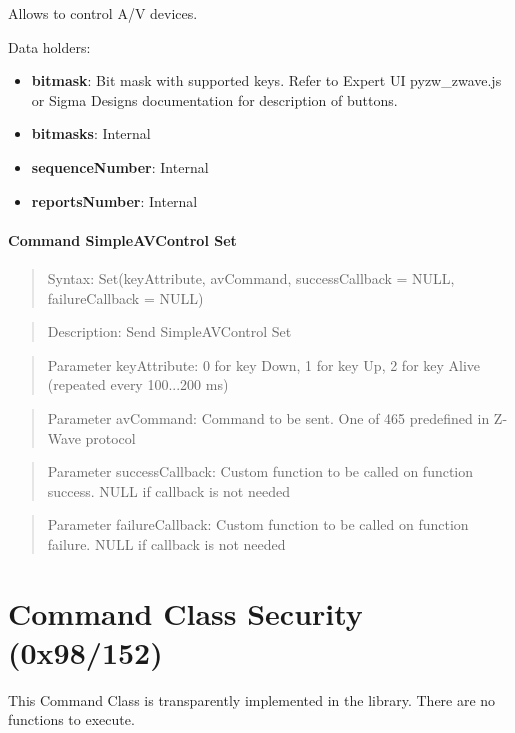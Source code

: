 Allows to control A/V devices.
\newline

\noindent
Data holders:

\begin{itemize}
\item \textbf{bitmask}: Bit mask with supported keys. Refer to Expert UI pyzw\_zwave.js or Sigma Designs documentation for description of buttons.
\item \textbf{bitmasks}: Internal
\item \textbf{sequenceNumber}: Internal
\item \textbf{reportsNumber}: Internal
\end{itemize}

\paragraph{Command SimpleAVControl Set}
\begin{quote}Syntax: Set(keyAttribute, avCommand, successCallback = NULL, failureCallback = NULL)\end{quote}
\begin{quote}Description: Send SimpleAVControl Set\end{quote}
\begin{quote}Parameter keyAttribute: 0 for key Down, 1 for key Up, 2 for key Alive (repeated every 100...200 ms)\end{quote}
\begin{quote}Parameter avCommand: Command to be sent. One of 465 predefined in Z-Wave protocol\end{quote}
\begin{quote}Parameter successCallback: Custom function to be called on function success. NULL if callback is not needed\end{quote}
\begin{quote}Parameter failureCallback: Custom function to be called on function failure. NULL if callback is not needed\end{quote}



\section{Command Class Security (0x98/152)}

This Command Class is transparently implemented in the library. There are no functions to execute.
\newline

